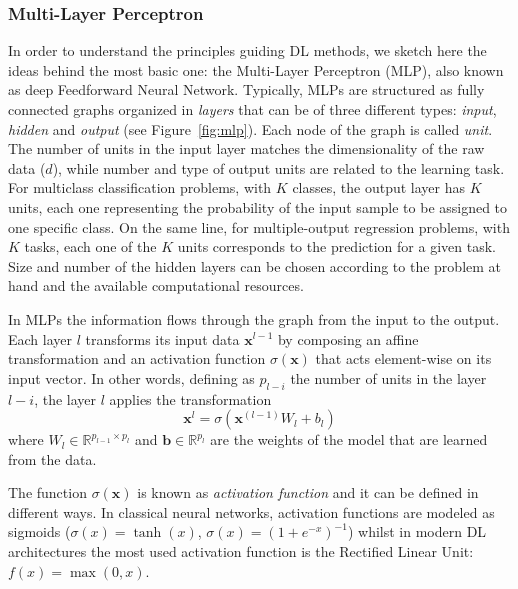 		\subsubsection{Multi-Layer Perceptron} \label{sec:mlp}
		In order to understand the principles guiding DL methods, we sketch here the ideas behind the most basic one: the Multi-Layer Perceptron (\ac{MLP}), also known as deep Feedforward Neural Network.
	    Typically, MLPs are structured as fully connected graphs organized in \textit{layers} that can be of three different types: \textit{input}, \textit{hidden} and \textit{output} (see Figure~\ref{fig:mlp}).
	    Each node of the graph is called \textit{unit}.
	    The number of units in the input layer matches the dimensionality of the raw data ($d$), while number and type of output units are related to the learning task.
	    For multiclass classification problems, with $K$ classes, the output layer has $K$ units, each one representing the probability of the input sample to be assigned to one specific class.
	    On the same line, for multiple-output regression problems, with $K$ tasks, each one of the $K$ units corresponds to the prediction for a given task.
	    Size and number of the hidden layers can be chosen according to the problem at hand and the available computational resources.
	    
   	    
	    
	    In MLPs the information flows through the graph from the input to the output.
	    Each layer $l$ transforms its input data $\bm{x}^{l-1}$ by composing an affine transformation and an activation function $\sigma(\bm{x})$ that acts element-wise on its input vector.
	    In other words, defining as $p_{l-i}$ the number of units in the layer $l-i$, the layer $l$ applies the transformation
	    $$
	    \bm{x}^{l} = \sigma(\bm{x}^{(l-1)}W_l+b_l)
	    $$
	    where $W_l \in \mathbb{R}^{p_{l-1} \times p_l}$ and $\bm{b} \in \mathbb{R}^{p_l}$ are the weights of the model that are learned from the data.
	    
	    The function $\sigma(\bm{x})$ is known as \textit{activation function} and it can be defined in different ways.
	    In classical neural networks, activation functions are modeled as sigmoids (\eg $\sigma(x)=\tanh(x)$, $\sigma(x)=(1+e^{-x})^{-1}$) whilst in modern DL architectures the most used activation function is the Rectified Linear Unit: $f(x)=\max(0,x)$.

